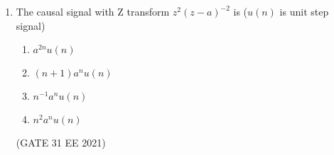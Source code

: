 \begin{enumerate}[label=\thechapter.\arabic*,ref=\thechapter.\theenumi]
\item The causal signal with Z transform $z^2(z - a)^{-2}$ is ($u(n)$ is unit step signal)
\begin{enumerate}
    \item $a^{2n}u(n)$
    \item $(n + 1)a^nu(n)$
    \item $n^{-1}a^nu(n)$
    \item $n^2a^nu(n)$
\end{enumerate}

\hfill(GATE 31 EE 2021) 

\solution

\pagebreak
\end{enumerate}
